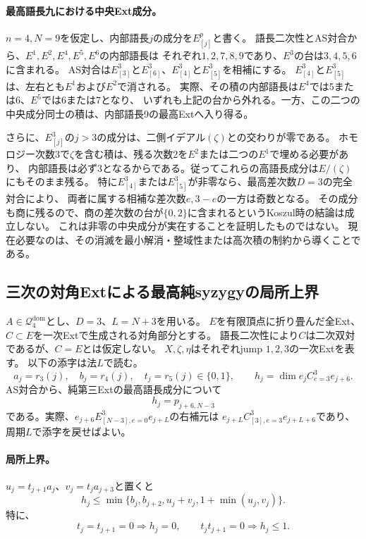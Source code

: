 \documentclass[11pt,a4paper]{ltjsarticle}
\begin{document}
\paragraph{最高語長九における中央Ext成分。}
\label{note:n4-middle-ext-obstruction}
$n=4,N=9$を仮定し、内部語長$j$の成分を$E^p_{[j]}$と書く。
語長二次性とAS対合から、$E^1,E^2,E^4,E^5,E^6$の内部語長は
それぞれ$1,2,7,8,9$であり、$E^3$の台は$3,4,5,6$に含まれる。
AS対合は$E^3_{[3]}$と$E^3_{[6]}$、$E^3_{[4]}$と$E^3_{[5]}$を相補にする。
$E^3_{[4]}$と$E^3_{[5]}$は、左右とも$E^1$および$E^2$で消される。
実際、その積の内部語長は$E^4$では5または6、$E^5$では6または7となり、
いずれも上記の台から外れる。一方、この二つの中央成分同士の積は、内部語長9の最高Extへ入り得る。

さらに、$E^3_{[j]}$の$j>3$の成分は、二側イデアル$(\zeta)$との交わりが零である。
ホモロジー次数3で$\zeta$を含む積は、残る次数2を$E^2$または二つの$E^1$で埋める必要があり、
内部語長は必ず3となるからである。従ってこれらの高語長成分は$E/(\zeta)$にもそのまま残る。
特に$E^3_{[4]}$または$E^3_{[5]}$が非零なら、最高差次数$D=3$の完全対合により、
両者に属する相補な差次数$e,3-e$の一方は奇数となる。
その成分も商に残るので、商の差次数の台が$\{0,2\}$に含まれるというKoszul時の結論は成立しない。
これは非零の中央成分が実在することを証明したものではない。
現在必要なのは、その消滅を最小解消・整域性または高次積の制約から導くことである。

\subsection{三次の対角Extによる最高純syzygyの局所上界}
\label{note:n4-cubic-corner-bounds}
$A\in\mathcal Q_4^{\mathrm{dom}}$とし、$D=3$、$L=N+3$を用いる。
$E$を有限頂点に折り畳んだ全Ext、$C\subset E$を一次Extで生成される対角部分とする。
語長二次性により$C$は二次双対であるが、$C=E$とは仮定しない。
$X,\zeta,\eta$はそれぞれjump $1,2,3$の一次Extを表す。
以下の添字は法$L$で読む。
\[
 a_j=r_3(j),\quad b_j=r_4(j),\quad t_j=r_5(j)\in\{0,1\},\qquad
 h_j=\dim e_jC^3_{e=3}e_{j+6}.
\]
AS対合から、純第三Extの最高語長成分について
\[
 h_j=p_{j+6,N-3}
\]
である。実際、$e_{j+6}E^3_{[N-3],e=0}e_{j+L}$の右補元は
$e_{j+L}C^3_{[3],e=3}e_{j+L+6}$であり、周期$L$で添字を戻せばよい。

\paragraph{局所上界。}
$u_j=t_{j+1}a_j$、$v_j=t_ja_{j+3}$と置くと
\begin{equation}\label{note:eq:n4-cubic-corner-bound}
 h_j\le
 \min\{b_j,b_{j+2},u_j+v_j,1+\min(u_j,v_j)\}.
\end{equation}
特に、
\[
 t_j=t_{j+1}=0\Longrightarrow h_j=0,
 \qquad
 t_jt_{j+1}=0\Longrightarrow h_j\le1.
\]
\end{document}
